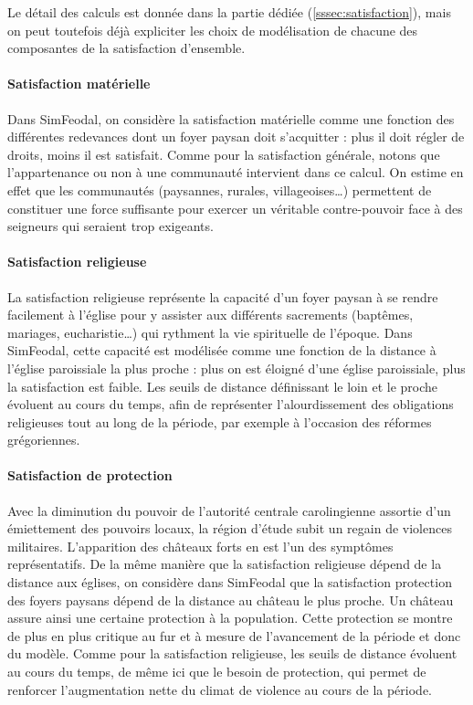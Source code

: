 Le détail des calculs est donnée dans la partie dédiée (\cref{sssec:satisfaction}), mais on peut toutefois déjà expliciter les choix de modélisation de chacune des composantes de la satisfaction d'ensemble.

\paragraph{Satisfaction matérielle}

Dans SimFeodal, on considère la satisfaction matérielle comme une fonction des différentes redevances dont un foyer paysan doit s'acquitter : plus il doit régler de droits, moins il est satisfait.
Comme pour la satisfaction générale, notons que l'appartenance ou non à une communauté intervient dans ce calcul.
On estime en effet que les communautés (paysannes, rurales, villageoises\ldots) permettent de constituer une force suffisante pour exercer un véritable contre-pouvoir face à des seigneurs qui seraient trop exigeants.

\paragraph{Satisfaction religieuse}

La satisfaction religieuse représente la capacité d'un foyer paysan à se rendre facilement à l'église pour y assister aux différents sacrements (baptêmes, mariages, eucharistie\ldots) qui rythment la vie spirituelle de l'époque.
Dans SimFeodal, cette capacité est modélisée comme une fonction de la distance à l'église paroissiale la plus proche : plus on est éloigné d'une église paroissiale, plus la satisfaction est faible.
Les seuils de distance définissant le \og loin\fg{} et le \og proche\fg{} évoluent au cours du temps, afin de représenter l'alourdissement des obligations religieuses tout au long de la période, par exemple à l'occasion des réformes grégoriennes.

\paragraph{Satisfaction de \og protection\fg{}}

Avec la diminution du pouvoir de l'autorité centrale carolingienne assortie d'un émiettement des pouvoirs locaux, la région d'étude subit un regain de violences militaires.
L'apparition des châteaux forts en est l'un des symptômes représentatifs.
De la même manière que la satisfaction religieuse dépend de la distance aux églises, on considère dans SimFeodal que la satisfaction \og protection\fg{} des foyers paysans dépend de la distance au château le plus proche.
Un château assure ainsi une certaine protection à la population.
Cette protection se montre de plus en plus critique au fur et à mesure de l'avancement de la période et donc du modèle.
Comme pour la satisfaction religieuse, les seuils de distance évoluent au cours du temps, de même ici que le \og besoin de protection\fg{}, qui permet de renforcer l'augmentation nette du climat de violence au cours de la période.

